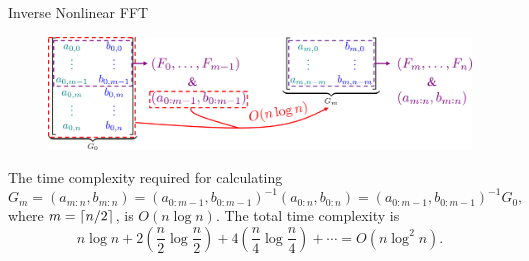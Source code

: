 \addtocounter{framenumber}{-1}
\begin{frame}{Inverse Nonlinear FFT}
    \vspace{0.3cm}
    \begin{figure}
        \centering
        \includegraphics[height=0.24\textwidth]{figures/iNLFFT.png}
    \end{figure}
    
    The time complexity required for calculating
    \begin{equation*}
        G_m = (a_{m:n},b_{m:n}) = (a_{0:m-1},b_{0:m-1})^{-1} (a_{0:n},b_{0:n}) = (a_{0:m-1},b_{0:m-1})^{-1} G_0,
    \end{equation*}
    where $m=\left\lceil{n/2}\right\rceil$, is $O(n\log n)$. The total time complexity is
    \begin{equation}
        n\log n + 2\left(\frac{n}{2}\log\frac{n}{2}\right) + 4\left(\frac{n}{4}\log\frac{n}{4}\right) + \cdots = O(n\log^2n).
    \end{equation}
\end{frame}